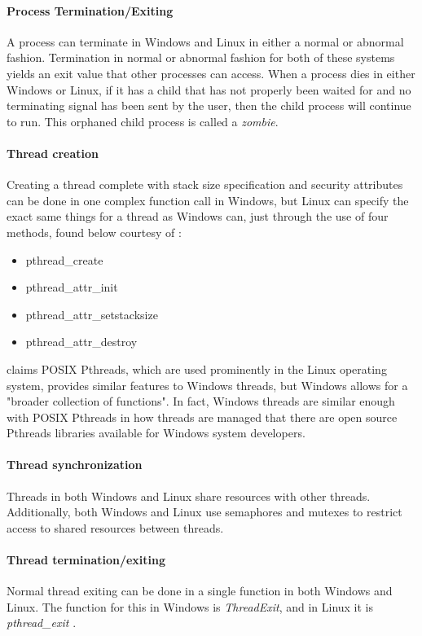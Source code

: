 \documentclass[letterpaper,10pt,titlepage]{article}
\begin{document}
\paragraph{Process Termination/Exiting}
A process can terminate in Windows and Linux in either a normal or abnormal fashion. Termination in normal or abnormal fashion for both of these systems yields an exit value that other processes can access. When a process dies in either Windows or Linux, if it has a child that has not properly been waited for and no terminating signal has been sent by the user, then the child process will continue to run. This orphaned child process is called a \emph{zombie}. 
\paragraph{Thread creation}
Creating a thread complete with stack size specification and security attributes can be done in one complex function call in Windows, but Linux can specify the exact same things for a thread as Windows can, just through the use of four methods, found below courtesy of \cite{linux1}: 
\begin{itemize}
\item pthread\_create
\item pthread\_attr\_init
\item pthread\_attr\_setstacksize
\item pthread\_attr\_destroy
\end{itemize}
\cite{windows3} claims POSIX Pthreads, which are used prominently in the Linux operating system, provides similar features to Windows threads, but Windows allows for a "broader collection of functions". In fact, Windows threads are similar enough with POSIX Pthreads in how threads are managed that there are open source Pthreads libraries available for Windows system developers.
\paragraph{Thread synchronization}
Threads in both Windows and Linux share resources with other threads. Additionally, both Windows and Linux use semaphores and mutexes to restrict access to shared resources between threads.
\paragraph{Thread termination/exiting}
Normal thread exiting can be done in a single function in both Windows and Linux. The function for this in Windows is \emph{ThreadExit}, and in Linux it is \emph{pthread\_exit} \cite{windows1} \cite{linux1}.
\end{document}
